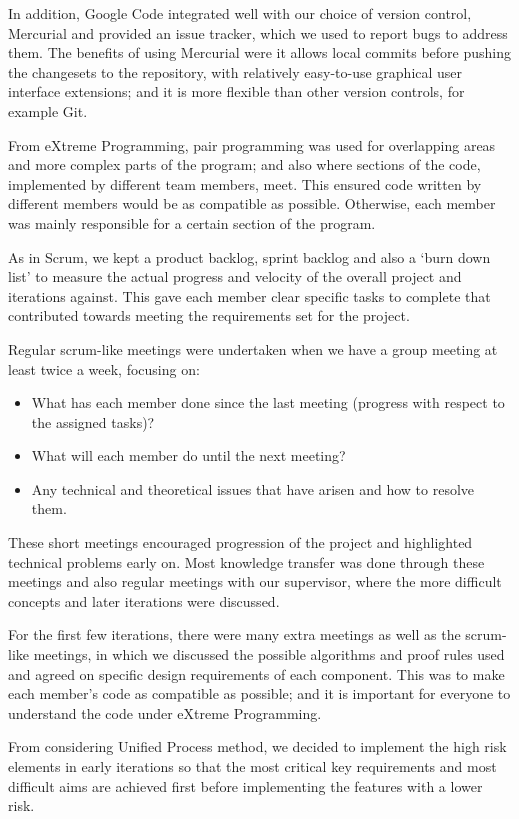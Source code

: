 In addition, Google Code integrated well with our choice of version control, Mercurial and provided an issue tracker, which we used to report bugs to address them. The benefits of using Mercurial were it allows local commits before pushing the changesets to the repository, with relatively easy-to-use graphical user interface extensions; and it is more flexible than other version controls, for example Git.

From eXtreme Programming, pair programming was used for overlapping areas and more complex parts of the program; and also where sections of the code, implemented by different team members, meet. This ensured code written by different members would be as compatible as possible. Otherwise, each member was mainly responsible for a certain section of the program.

As in Scrum, we kept a product backlog, sprint backlog and also a `burn down list' to measure the actual progress and velocity of the overall project and iterations against. This gave each member clear specific tasks to complete that contributed towards meeting the requirements set for the project.

Regular scrum-like meetings were undertaken when we have a group meeting at least twice a week, focusing on:

\begin{itemize}
\item What has each member done since the last meeting (progress with respect to the assigned tasks)?
\item What will each member do until the next meeting?
\item Any technical and theoretical issues that have arisen and how to resolve them.
\end{itemize}

These short meetings encouraged progression of the project and highlighted technical problems early on. Most knowledge transfer was done through these meetings and also regular meetings with our supervisor, where the more difficult concepts and later iterations were discussed.

For the first few iterations, there were many extra meetings as well as the scrum-like meetings, in which we discussed the possible algorithms and proof rules used and agreed on specific design requirements of each component. This was to make each member's code as compatible as possible; and it is important for everyone to understand the code under eXtreme Programming.

From considering Unified Process method, we decided to implement the high risk elements in early iterations so that the most critical key requirements and most difficult aims are achieved first before implementing the features with a lower risk.

